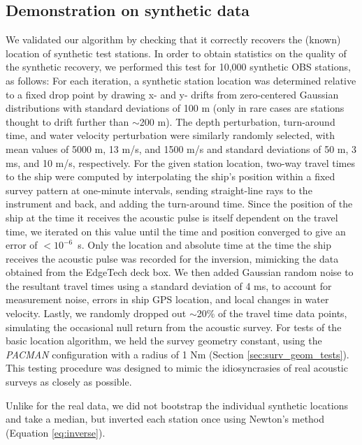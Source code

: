 
\subsection{Demonstration on synthetic data}
We validated our algorithm by checking that it correctly recovers the (known) location of synthetic test stations. In order to obtain statistics on the quality of the synthetic recovery, we performed this test for 10,000 synthetic OBS stations, as follows: For each iteration, a synthetic station location was determined relative to a fixed drop point by drawing x- and y- drifts from zero-centered Gaussian distributions with standard deviations of 100 m (only in rare cases are stations thought to drift further than $\sim$200 m). The depth perturbation, turn-around time, and water velocity perturbation were similarly randomly selected, with mean values of 5000 m, 13 m/s, and 1500 m/s and standard deviations of 50 m, 3 ms, and 10 m/s, respectively. For the given station location, two-way travel times to the ship were computed by interpolating the ship's position within a fixed survey pattern at one-minute intervals, sending straight-line rays to the instrument and back, and adding the turn-around time. Since the position of the ship at the time it receives the acoustic pulse is itself dependent on the travel time, we iterated on this value until the time and position converged to give an error of \mbox{$<10^{-6}$ s}. Only the location and absolute time at the time the ship receives the acoustic pulse was recorded for the inversion, mimicking the data obtained from the EdgeTech deck box. We then added Gaussian random noise to the resultant travel times using a standard deviation of 4 ms, to account for measurement noise, errors in ship GPS location, and local changes in water velocity. Lastly, we randomly dropped out $\sim$20\% of the travel time data points, simulating the occasional null return from the acoustic survey. For tests of the basic location algorithm, we held the survey geometry constant, using the \textit{PACMAN} configuration with a radius of 1 Nm (Section \ref{sec:surv_geom_tests}). This testing procedure was designed to mimic the idiosyncrasies of real acoustic surveys as closely as possible. 

Unlike for the real data, we did not bootstrap the individual synthetic locations and take a median, but inverted each station once using Newton's method (Equation \ref{eq:inverse}).   

